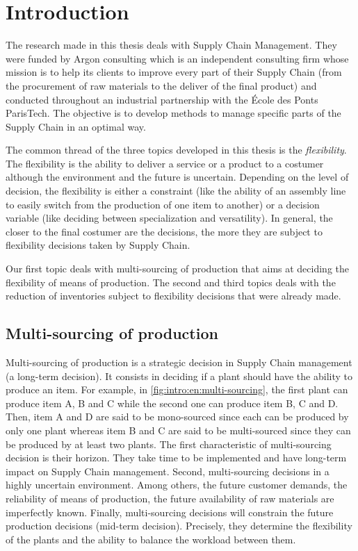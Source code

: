 \chapter{Introduction}
\label{chap:intro:en}


The research made in this thesis deals with Supply Chain Management.
They were funded by Argon consulting which is an independent consulting firm whose mission is to help its clients to improve every part of their Supply Chain (from the procurement of raw materials to the deliver of the final product) and conducted throughout an industrial partnership with the \'Ecole des Ponts ParisTech.
The objective is to develop methods to manage specific parts of the Supply Chain in an optimal way.



The common thread of the three topics developed in this thesis is the \emph{flexibility}.
The flexibility is the ability to deliver a service or a product to a costumer although the environment and the future is uncertain.
Depending on the level of decision, the flexibility is either a constraint (like the ability of an assembly line to easily switch from the production of one item to another) or a decision variable (like deciding between specialization and versatility).
In general, the closer to the final costumer are the decisions, the more they are subject to flexibility decisions taken by Supply Chain.


Our first topic deals with multi-sourcing of production that aims at deciding the flexibility of means of production.
The second and third topics deals with the reduction of inventories subject to flexibility decisions that were already made.


\section{Multi-sourcing of production}
\label{sec:intro:en:multi-sourcing}


Multi-sourcing of production is a strategic decision in Supply Chain management (\ie a long-term decision).
It consists in deciding if a plant should have the ability to produce an item.
For example, in \cref{fig:intro:en:multi-sourcing}, the first plant can produce item A, B and C while the second one can produce item B, C and D.
Then, item A and D are said to be mono-sourced since each can be produced by only one plant whereas item B and C are said to be multi-sourced since they can be produced by at least two plants.
The first characteristic of multi-sourcing decision is their horizon.
They take time to be implemented and have long-term impact on Supply Chain management.
Second, multi-sourcing decisions in a highly uncertain environment.
Among others, the future customer demands, the reliability of means of production, the future availability of raw materials are imperfectly known.
Finally, multi-sourcing decisions will constrain the future production decisions (\ie mid-term decision).
Precisely, they determine the flexibility of the plants and the ability to balance the workload between them.


